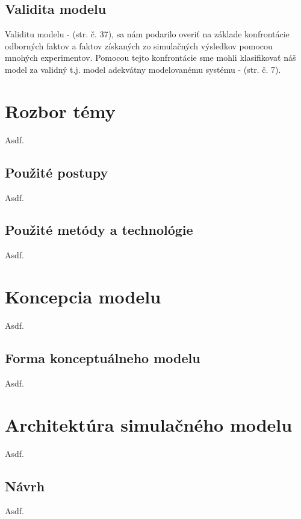 \documentclass[11pt,a4paper]{article}
\begin{document}
    \subsection{Validita modelu}

        Validitu modelu - \cite{IMS}(str. č. 37), sa nám podarilo overiť na základe konfrontácie odborných faktov a faktov získaných zo simulačných výsledkov pomocou mnohých experimentov. Pomocou tejto konfrontácie sme mohli klasifikovať náš model za validný t.j. model adekvátny modelovanému systému - \cite{IMS}(str. č. 7).

\section{Rozbor témy}

    Asdf.

    \subsection{Použité postupy}

        Asdf.

    \subsection{Použité metódy a technológie}

        Asdf.

\section{Koncepcia modelu}

    Asdf.

    \subsection{Forma konceptuálneho modelu}

        Asdf.


\section{Architektúra simulačného modelu}

    Asdf.

    \subsection{Návrh}

        Asdf.
\end{document}
